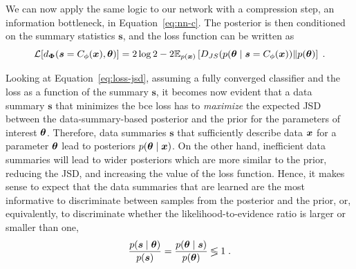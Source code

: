 We can now apply the same logic to our network with a compression step, an information bottleneck, in Equation~\eqref{eq:nn-c}. The posterior is then conditioned on the summary statistics $\boldsymbol{s}$, and the loss function can be written as
\begin{equation} \label{eq:loss-jsd}
   \mathcal{L}[d_{\bm{\Phi}}(\boldsymbol{s} = C_\phi(\bm{x}), \bm{\theta})] = 2 \log2 - 2\mathbb{E}_{p(\bm{x})}\left[D_{JS}(p(\bm{\theta}\mid\boldsymbol{s} = C_\phi(\bm{x}))\| p(\bm{\theta})\right] \;.
\end{equation}

Looking at Equation~\eqref{eq:loss-jsd}, assuming a fully converged classifier and the loss as a function of the summary $\boldsymbol{s}$, it becomes now evident that a data summary $\boldsymbol{s}$ that minimizes the \gls*{bce} loss has to \emph{maximize} the expected JSD between the data-summary-based posterior and the prior for the parameters of interest $\bm{\theta}$. Therefore, data summaries $\boldsymbol{s}$ that sufficiently describe data $\bm{x}$ for a parameter $\bm{\theta}$ lead to posteriors $p(\bm{\theta}\mid\bm{x})$. On the other hand, inefficient data summaries will lead to wider posteriors which are more similar to the prior, reducing the JSD, and increasing the value of the loss function.  Hence, it makes sense to expect that the data summaries that are learned are the most informative to discriminate between samples from the posterior and the prior, or, equivalently, to discriminate whether the likelihood-to-evidence ratio is larger or smaller than one,
\begin{equation}
    \frac{p(\boldsymbol{s} \mid \bm{\theta})}{p(\boldsymbol{s})}  = 
    \frac{p(\bm{\theta}\mid \boldsymbol{s})}{p(\bm{\theta})} 
    \lessgtr 1\;.
\end{equation}

\clearpage

